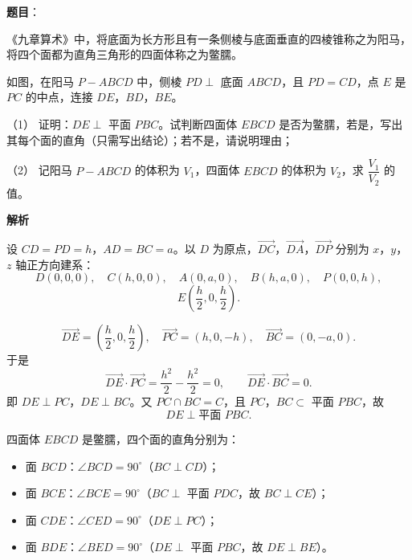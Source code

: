 \begin{answer}

\textbf{题目}：

《九章算术》中，将底面为长方形且有一条侧棱与底面垂直的四棱锥称之为阳马，将四个面都为直角三角形的四面体称之为鳖臑。

如图，在阳马 \(P-ABCD\) 中，侧棱 \(PD\perp\) 底面 \(ABCD\)，且 \(PD=CD\)，点 \(E\) 是 \(PC\) 的中点，连接 \(DE\)，\(BD\)，\(BE\)。

（1） 证明：\(DE\perp\) 平面 \(PBC\)。试判断四面体 \(EBCD\) 是否为鳖臑，若是，写出其每个面的直角（只需写出结论）；若不是，请说明理由；

（2） 记阳马 \(P-ABCD\) 的体积为 \(V_1\)，四面体 \(EBCD\) 的体积为 \(V_2\)，求 \(\dfrac{V_1}{V_2}\) 的值。
\nopagebreak[4]
\begin{center}\end{center}
\nopagebreak[4]
\textbf{解析}

设 \(CD=PD=h\)，\(AD=BC=a\)。以 \(D\) 为原点，\(\overrightarrow{DC}\)，\(\overrightarrow{DA}\)，\(\overrightarrow{DP}\) 分别为 \(x\)，\(y\)，\(z\) 轴正方向建系：
\nopagebreak[4]
\[
D(0,0,0),\quad C(h,0,0),\quad A(0,a,0),\quad B(h,a,0),\quad P(0,0,h),
\]
\nopagebreak[4]
\[
E\left(\frac h2,0,\frac h2\right).
\]


\nopagebreak[4]
\[
\overrightarrow{DE}=\left(\frac h2,0,\frac h2\right),\quad
\overrightarrow{PC}=(h,0,-h),\quad
\overrightarrow{BC}=(0,-a,0).
\]
于是
\nopagebreak[4]
\[
\overrightarrow{DE}\cdot\overrightarrow{PC}=\frac{h^2}{2}-\frac{h^2}{2}=0,\qquad
\overrightarrow{DE}\cdot\overrightarrow{BC}=0.
\]
即 \(DE\perp PC\)，\(DE\perp BC\)。又 \(PC\cap BC=C\)，且 \(PC\)，\(BC\subset\) 平面 \(PBC\)，故
\nopagebreak[4]
\[
DE\perp\text{平面 }PBC.
\]

四面体 \(EBCD\) 是鳖臑，四个面的直角分别为：
\begin{itemize}
\item 面 \(BCD\)：\(\angle BCD=90^\circ\)（\(BC\perp CD\)）；
\item 面 \(BCE\)：\(\angle BCE=90^\circ\)（\(BC\perp\) 平面 \(PDC\)，故 \(BC\perp CE\)）；
\item 面 \(CDE\)：\(\angle CED=90^\circ\)（\(DE\perp PC\)）；
\item 面 \(BDE\)：\(\angle BED=90^\circ\)（\(DE\perp\) 平面 \(PBC\)，故 \(DE\perp BE\)）。
\end{itemize}


\end{answer}
